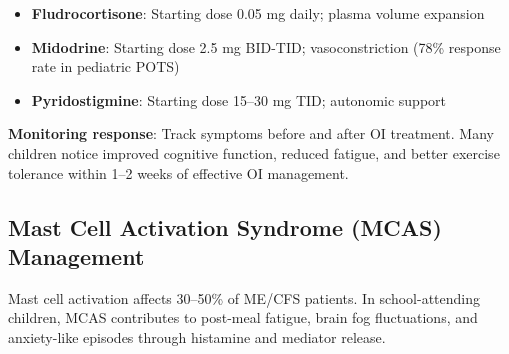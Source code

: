 \begin{itemize}
    \item \textbf{Fludrocortisone}: Starting dose 0.05 mg daily; plasma volume expansion
    \item \textbf{Midodrine}: Starting dose 2.5 mg BID-TID; vasoconstriction (78\% response rate in pediatric POTS)~\cite{Ojha2024pediatricPOTS}
    \item \textbf{Pyridostigmine}: Starting dose 15--30 mg TID; autonomic support
\end{itemize}

\textbf{Monitoring response}: Track symptoms before and after OI treatment. Many children notice improved cognitive function, reduced fatigue, and better exercise tolerance within 1--2 weeks of effective OI management.

\subsection{Mast Cell Activation Syndrome (MCAS) Management}
\label{subsec:ped-ambulatory-mcas}

Mast cell activation affects 30--50\% of ME/CFS patients. In school-attending children, MCAS contributes to post-meal fatigue, brain fog fluctuations, and anxiety-like episodes through histamine and mediator release.

